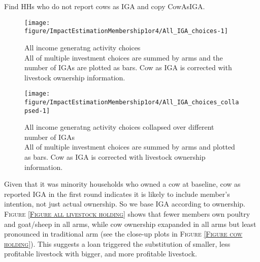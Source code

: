 Find HHs who do not report cows as IGA and copy \textsf{CowAsIGA}.


\begin{Schunk}
\begin{figure}

{\centering \texttt{[image: figure/ImpactEstimationMembership1or4/All\_IGA\_choices-1]} 

}

\caption{All income generatng activity choices\\ {\footnotesize All of multiple investment choices are summed by arms and the number of IGAs are plotted as bars. Cow as IGA is corrected with livestock ownership information. \setlength{\baselineskip}{8pt}}}\label{Figure All IGA choices}
\end{figure}
\end{Schunk}
\begin{Schunk}
\begin{figure}

{\centering \texttt{[image: figure/ImpactEstimationMembership1or4/All\_IGA\_choices\_collapsed-1]} 

}

\caption{All income generatng activity choices collapsed over different number of IGAs\\ {\footnotesize All of multiple investment choices are summed by arms and plotted as bars. Cow as IGA is corrected with livestock ownership information.\setlength{\baselineskip}{8pt}}}\label{Figure All IGA choices collapsed}
\end{figure}
\end{Schunk}


Given that it was minority households who owned a cow at baseline, cow as reported IGA in the first round indicates it is likely to include member's intention, not just actual ownership. So we base IGA according to ownership. \textsc{\small Figure \ref{Figure all livestock holding}} shows that fewer members own poultry and goat/sheep in all arms, while cow ownership exapanded in all arms but least pronounced in \textsf{traditional} arm (see the close-up plots in \textsc{\small Figure \ref{Figure cow holding}}). This suggests a loan triggered the substitution of smaller, less profitable livestock with bigger, and more profitable livestock.

